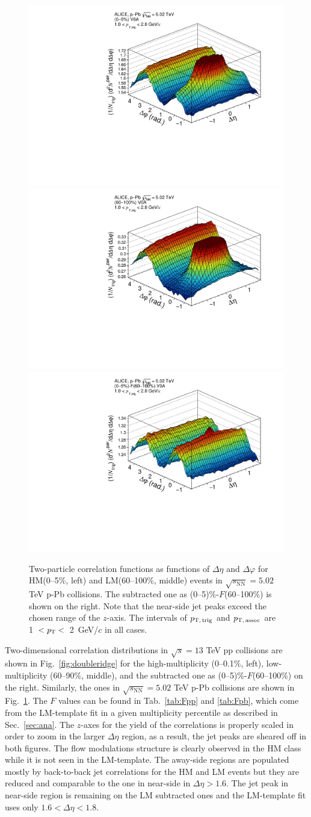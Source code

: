 \begin{figure}[h!]
			\includegraphics[width=0.33 \textwidth]{figures/corr_1_0_2_pPb.pdf}
			\includegraphics[width=0.33 \textwidth]{figures/corr_1_6_2_pPb.pdf}
			\includegraphics[width=0.33 \textwidth]{figures/corr_sub_fit_1_0_2_pPb.pdf}
\caption{Two-particle correlation functions as functions of $\Delta\eta$ and $\Delta\varphi$ for HM(0--5\%, left) and LM(60--100\%, middle) events in $\sqrt{s_{\mathrm{NN}}}=5.02$ TeV p-Pb collisions. The subtracted one as (0--5)\%-$F$(60--100\%) is shown on the right. Note that the near-side jet peaks exceed the chosen range of the $z$-axis. The intervals of $p_\mathrm{T,\,trig}$ and $p_\mathrm{T,\,assoc}$ are 1~$<\it{p}_{\rm{T}}<$~2~GeV/$c$ in all cases.}
\label{fig:doubleridgepPb}
\end{figure}

Two-dimensional correlation distributions in $\sqrt{s}=13$ TeV pp collisions are shown in Fig.~\ref{fig:doubleridge} for the high-multiplicity (0--0.1\%, left), low-multiplicity (60--90\%, middle), and the subtracted one as (0--5)\%-$F$(60--100\%) on the right. Similarly, the ones in $\sqrt{s_{\mathrm{NN}}}=5.02$ TeV p-Pb collisions are shown in Fig.~\ref{fig:doubleridgepPb}. The $F$ values can be found in Tab.~\ref{tab:Fpp} and \ref{tab:Fpb}, which come from the LM-template fit in a given multiplicity percentile as described in Sec.~\ref{sec:ana}. 
The $z$-axes for the yield of the correlations is properly scaled in order to zoom in the larger $\Delta\eta$ region, as a result, the jet peaks are sheared off in both figures. The flow modulations structure is clearly observed in the HM class while it is not seen in the LM-template. The away-side regions are populated mostly by back-to-back jet correlations for the HM and LM events but they are reduced and comparable to the one in near-side in $\Delta\eta > 1.6$. The jet peak in near-side region is remaining on the LM subtracted ones and the LM-template fit uses only $1.6< \Delta\eta < 1.8$.

